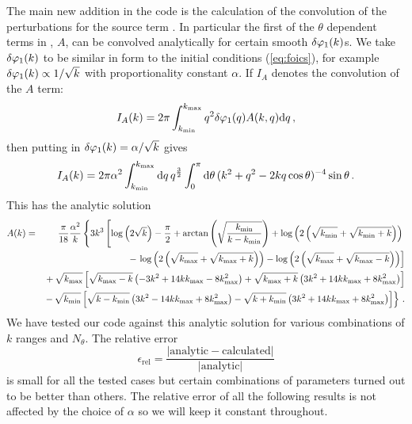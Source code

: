 The main new addition in the code is the calculation of the
convolution of the perturbations for the source term
. In particular the first of the $\theta$ dependent terms in
, $A$,
can be convolved analytically for certain smooth $\delta\varphi_{1}(k)$s. 
 We take $\delta\varphi_{1}(k)$ to be similar in form to the initial conditions
(\ref{eq:foics}), for example $\delta\varphi_{1}(k)\propto 1/\sqrt{k}$ with proportionality constant
$\alpha$.
If $I_A$ denotes the convolution of the $A$ term:
% 
\begin{equation}
 I_A (k) = 2\pi \int_{k_{\mathrm{min}}}^{k_{\mathrm{max}}} q^2 \delta\varphi_{1}(q) A(k, q) \mathrm{d} q \,,
\end{equation}
% 
then putting in $\delta\varphi_{1}(k) = \alpha/\sqrt{k}$ gives
% 
\begin{equation}
 I_A(k) = 2\pi \alpha^2 \int_{k_{\mathrm{min}}}^{k_{\mathrm{max}}} \mathrm{d} q\, q^{\frac{3}{2}}
\int_{0}^{\pi} \mathrm{d}\theta\, (k^2 + q^2 -2k q \cos{\theta})^{-4} \sin{\theta}\,. 
\end{equation}
% 
This has the analytic solution
% 
\begin{eqnarray}
\label{eq:err-analytic-num}
 A(k) &=& \frac{\pi}{18}\frac{\alpha^2}{k} \left\{ 
3k^3\left[\log\left(2\sqrt{k}\right) - \frac{\pi}{2}  + 
\arctan\left(\sqrt{\frac{k_{\mathrm{min}}}{k-k_{\mathrm{min}}}}\right) 
 + \log\left(2\left(\sqrt{k_{\mathrm{min}}} + \sqrt{k_{\mathrm{min}} + k}\right)\right) \right.\right. \nonumber \\
&& \left. -\, \log\left(2\left(\sqrt{k_{\mathrm{max}}} + \sqrt{k_{\mathrm{max}} + k}\right)\right) 
  - \log\left(2\left(\sqrt{k_{\mathrm{max}}} + \sqrt{k_{\mathrm{max}} - k}\right)\right) \right]  \nonumber \\
&& +\, \sqrt{k_{\mathrm{max}}}\left[\sqrt{k_{\mathrm{max}} -k} \left(-3k^2 + 14kk_{\mathrm{max}} - 8k_{\mathrm{max}}^2\right)  
 + \sqrt{k_{\mathrm{max}} +k} \left(3k^2 + 14kk_{\mathrm{max}} + 8k_{\mathrm{max}}^2\right)\right] \nonumber \\ 
&& \left. -\, \sqrt{k_{\mathrm{min}}}\left[\sqrt{k -k_{\mathrm{min}}} \left(3k^2 - 14kk_{\mathrm{max}} + 8k_{\mathrm{max}}^2\right) 
 - \sqrt{k +k_{\mathrm{min}}} \left(3k^2 + 14kk_{\mathrm{max}} + 8k_{\mathrm{max}}^2\right)\right] \right\} \,.
\end{eqnarray}
%
We have tested our code against this analytic solution for various
combinations of $k$ ranges and $N_\theta$. The relative error
%
\begin{equation}
 \epsilon_\mathrm{rel} = \frac{|\mathrm{analytic}- \mathrm{calculated} |}{|\mathrm{analytic}|}
\end{equation}
%
is small for all the tested cases but certain combinations of
parameters turned out to be better than others. The relative error of
all the following results is not affected by the choice of $\alpha$ so
we will keep it constant throughout.

